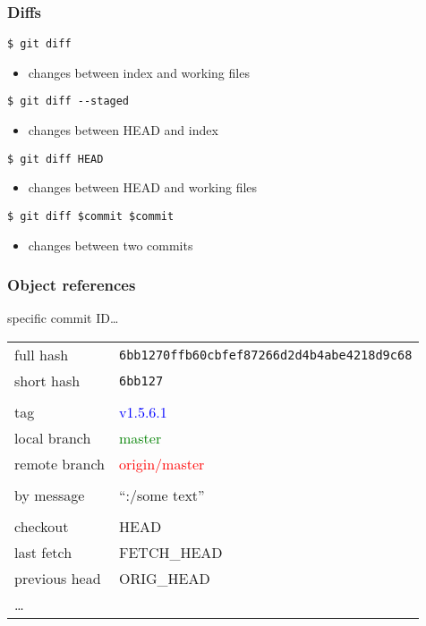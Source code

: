 \documentclass[english]{beamer}
\newcommand{\ttt}[1]{%
\texttt{\textcolor{code-black}{#1}}%
}
\newcommand{\CMD}[1]{%
\texttt{\textcolor{code-green}{#1}}%
}
\begin{document}
\begin{frame}
\frametitle{Diffs}

\CMD{\$ git diff}
\begin{itemize}
        \item changes between index and working files
\end{itemize}

\pause{}
\vspace{.1\textheight}

\CMD{\$ git diff {-}-staged}
\begin{itemize}
        \item changes between HEAD and index
\end{itemize}

\pause{}
\vspace{.1\textheight}

\CMD{\$ git diff HEAD}
\begin{itemize}
        \item changes between HEAD and working files
\end{itemize}

\pause{}
\vspace{.1\textheight}

\CMD{\$ git diff \$commit \$commit}
\begin{itemize}
        \item changes between two commits
\end{itemize}

\end{frame}

\begin{frame}
\frametitle{Object references}

specific commit ID\ldots
\vspace{\baselineskip}

{\small
\begin{tabular}{ll}
        full hash      & \ttt{6bb1270ffb60cbfef87266d2d4b4abe4218d9c68} \\
        short hash     & \ttt{6bb127} \\
        & \\
        tag            & \textcolor{blue}{v1.5.6.1} \\
        local branch   & \textcolor{green}{master} \\
        remote branch  & \textcolor{red}{origin/master} \\
        & \\
        by message     & ``:/some text'' \\
        & \\
        checkout       & HEAD \\
        last fetch     & FETCH\_HEAD \\
        previous head  & ORIG\_HEAD \\
        \ldots & \\
\end{tabular}
}

\vspace{.1\textheight}

\end{frame}
\end{document}
